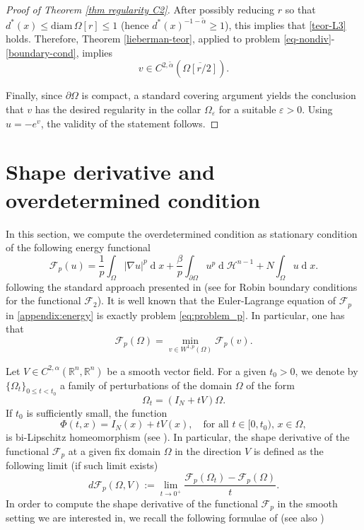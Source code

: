 \documentclass[10pt,a4paper, reqno]{amsart}
\numberwithin{equation}{section}
\newcommand{\R}{\mathbb{R}}
\renewcommand{\d}[1]{\ensuremath{\operatorname{d}\!{#1}}}
\begin{document}
\begin{proof}[Proof of Theorem \ref{thm regularity C2}]
After possibly reducing $r$ so that $d^\ast(x) \le \mathrm{diam}\,\Omega[r] \le 1$ (hence $d^\ast(x)^{-1-\tilde{\alpha}} \ge 1$), this implies  that \eqref{teor-L3} holds. Therefore, Theorem \ref{lieberman-teor}, applied to problem \eqref{eq-nondiv}-\eqref{boundary-cond}, implies
\[
    v\in C^{2,\tilde{\alpha}}(\overline{\Omega[r/2]}).
\]

Finally, since $\partial\Omega$ is compact, a standard covering argument yields the conclusion that $v$ has the desired regularity in the collar $\Omega_\varepsilon$ for a suitable $\varepsilon>0$. Using $u=-e^v$, the validity of the statement follows. 
\end{proof}

\section{Shape derivative and overdetermined condition}\label{sec: appendix shape}
In this section, we compute the overdetermined condition as stationary condition of the following energy functional 
\begin{equation}\label{appendix:energy}
    \mathcal{F}_p(u)=\frac{1}{p}\int_\Omega|\nabla u|^p\d{x}+\frac{\beta}{p}\int_{\partial\Omega}u^p\d{}\mathcal{H}^{n-1}+N\int_\Omega u\d{x}.
\end{equation}
following the standard approach presented in \cite{hepi18} (see \cite{bw} for Robin boundary conditions for the functional $\mathcal{F}_2$).
It is well known that the Euler-Lagrange equation of $\mathcal{F}_p$ in \eqref{appendix:energy} is exactly problem \eqref{eq:problem_p}. In particular, one has that 
\begin{equation*}
    \mathcal{F}_p(\Omega) = \min_{v \in W^{1,p}(\Omega)} \mathcal{F}_p(v).
\end{equation*}

Let $V\in C^{2,\alpha}(\R^n,\R^n)$ be a smooth vector field. For a given $t_0>0$, we denote by $\{\Omega_t\}_{0\leq t<t_0}$ a family of perturbations of the domain $\Omega$ of the form
\[\Omega_t=(I_N+tV)\Omega.\]
If $t_0$ is sufficiently small, the function 
\begin{equation}\label{eq: app Phi}
    \Phi(t,x)=I_N(x)+tV(x), \quad \text{for all }t \in [0,t_0),\,  x \in \Omega,
\end{equation} is bi-Lipschitz homeomorphism (see \cite[Remark 2.2]{cnt2024}). In particular, the shape derivative of the functional $\mathcal{F}_p$ at a given fix domain $\Omega$ in the direction $V$ is defined as the following limit (if such limit exists)
\begin{equation*}
    d\mathcal{F}_p(\Omega,V):=\lim_{t \to 0^+}\frac{\mathcal{F}_p(\Omega_t)-\mathcal{F}_p(\Omega)}{t}.
\end{equation*}
In order to compute the shape derivative of the functional $\mathcal{F}_p$ in the smooth setting we are interested in, we recall the following formulae of \cite[Theorem 5.2.2 \& Theorem 5.4.17]{hepi18} (see also \cite[Corollary 5.2.5 \& Proposition 5.4.18]{hepi18})
\end{document}
